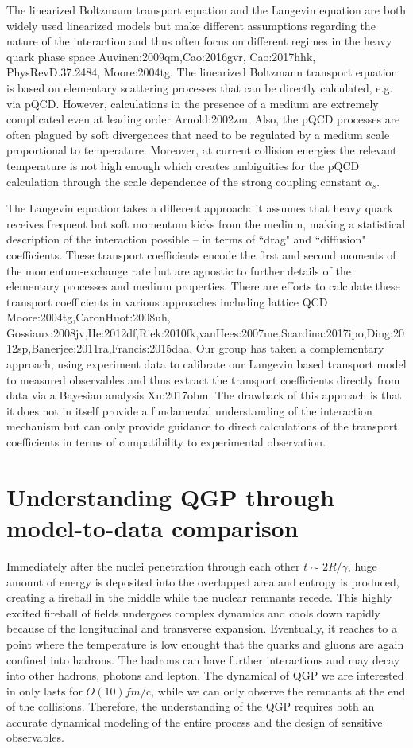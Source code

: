 The linearized Boltzmann transport equation and the Langevin equation are both widely used linearized models but make different assumptions regarding the nature of the interaction and thus often focus on different regimes in the heavy quark phase space {Auvinen:2009qm,Cao:2016gvr, Cao:2017hhk, PhysRevD.37.2484, Moore:2004tg}.
The linearized Boltzmann transport equation is based on elementary scattering processes that can be directly calculated, e.g. via pQCD.
However, calculations in the presence of a medium are extremely complicated even at leading order {Arnold:2002zm}.
Also, the pQCD processes are often plagued by soft divergences that need to be regulated by a medium scale proportional to temperature. Moreover, at current collision energies the relevant temperature is not high enough which creates ambiguities for the pQCD calculation through the scale dependence of the strong coupling constant $\alpha_s$.

The Langevin equation takes a different approach: 
it assumes that heavy quark receives frequent but soft momentum kicks from the medium, making a statistical description of the interaction possible -- in terms of ``drag" and ``diffusion" coefficients.
These transport coefficients encode the first and second moments of the momentum-exchange rate but are agnostic to further details of the elementary processes and medium properties.
There are efforts to calculate these transport coefficients in various approaches including lattice QCD {Moore:2004tg,CaronHuot:2008uh, Gossiaux:2008jv,He:2012df,Riek:2010fk,vanHees:2007me,Scardina:2017ipo,Ding:2012sp,Banerjee:2011ra,Francis:2015daa}. Our group has taken a complementary approach, using experiment data to calibrate our Langevin based transport model to measured observables and thus extract the transport coefficients directly from data via a Bayesian analysis {Xu:2017obm}. The drawback of this approach is that it does not in itself provide a fundamental understanding of the interaction mechanism but can only provide guidance to direct calculations of the transport coefficients in terms of compatibility to experimental observation.

\section{Understanding QGP through model-to-data comparison}
Immediately after the nuclei penetration through each other $t\sim 2R/\gamma$, huge amount of energy is deposited into the overlapped area and entropy is produced, creating a fireball in the middle while the nuclear remnants recede.
This highly excited fireball of fields undergoes complex dynamics and cools down rapidly because of the longitudinal and transverse expansion.
Eventually, it reaches to a point where the temperature is low enought that the quarks and gluons are again confined into hadrons. 
The hadrons can have further interactions and may decay into other hadrons, photons and lepton.
The dynamical of QGP we are interested in only lasts for $O(10) fm/$c, while we can only observe the remnants at the end of the collisions.
Therefore, the understanding of the QGP requires both an accurate dynamical modeling of the entire process and the design of sensitive observables.